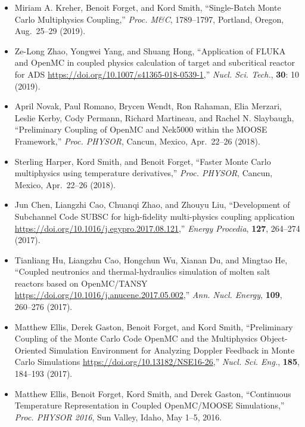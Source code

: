 \begin{itemize}
    
\item Miriam A. Kreher, Benoit Forget, and Kord Smith, ``Single-Batch Monte Carlo
Multiphysics Coupling,'' \textit{Proc. M\&C}, 1789--1797, Portland, Oregon, Aug.\ 25--29 (2019).

\item Ze-Long Zhao, Yongwei Yang, and Shuang Hong, ``Application of FLUKA and OpenMC
in coupled physics calculation of target and subcritical reactor for ADS
\url{https://doi.org/10.1007/s41365-018-0539-1},'' \textit{Nucl. Sci. Tech.}, \textbf{30}: 10 (2019).

\item April Novak, Paul Romano, Brycen Wendt, Ron Rahaman, Elia Merzari, Leslie
Kerby, Cody Permann, Richard Martineau, and Rachel N. Slaybaugh, ``Preliminary
Coupling of OpenMC and Nek5000 within the MOOSE Framework,'' \textit{Proc. PHYSOR},
Cancun, Mexico, Apr.\ 22--26 (2018).

\item Sterling Harper, Kord Smith, and Benoit Forget, ``Faster Monte Carlo
multiphysics using temperature derivatives,'' \textit{Proc. PHYSOR}, Cancun, Mexico,
Apr.\ 22--26 (2018).

\item Jun Chen, Liangzhi Cao, Chuanqi Zhao, and Zhouyu Liu, ``Development of
Subchannel Code SUBSC for high-fidelity multi-physics coupling application
\url{https://doi.org/10.1016/j.egypro.2017.08.121},'' \textit{Energy Procedia}, \textbf{127},
264--274 (2017).

\item Tianliang Hu, Liangzhu Cao, Hongchun Wu, Xianan Du, and Mingtao He, ``Coupled
neutronics and thermal-hydraulics simulation of molten salt reactors based on
OpenMC/TANSY \url{https://doi.org/10.1016/j.anucene.2017.05.002},''
\textit{Ann. Nucl. Energy}, \textbf{109}, 260--276 (2017).

\item Matthew Ellis, Derek Gaston, Benoit Forget, and Kord Smith, ``Preliminary
Coupling of the Monte Carlo Code OpenMC and the Multiphysics Object-Oriented
Simulation Environment for Analyzing Doppler Feedback in Monte Carlo
Simulations \url{https://doi.org/10.13182/NSE16-26},'' \textit{Nucl. Sci. Eng.},
\textbf{185}, 184--193 (2017).

\item Matthew Ellis, Benoit Forget, Kord Smith, and Derek Gaston, ``Continuous
Temperature Representation in Coupled OpenMC/MOOSE Simulations,'' \textit{Proc. PHYSOR
2016}, Sun Valley, Idaho, May 1--5, 2016.


\end{itemize}
